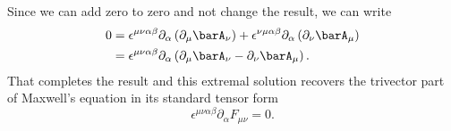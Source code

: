%
Since we can add zero to zero and not change the result, we can write
\begin{equation}\label{eqn:lagrangianFieldDensity:360}
\begin{aligned}
0
&=
  \epsilon^{\mu\nu\alpha\beta} \partial_{\alpha} \left(\partial_{\mu} \barA_{\nu} \right)
+ \epsilon^{\nu\mu\alpha\beta} \partial_{\alpha} \left(\partial_{\nu} \barA_{\mu} \right) \\
&= \epsilon^{\mu\nu\alpha\beta} \partial_{\alpha} \left(\partial_{\mu} \barA_{\nu} - \partial_{\nu} \barA_{\mu} \right) .
\end{aligned}
\end{equation}
%
That completes the result and this extremal solution recovers the trivector part of Maxwell's equation in its standard tensor form
%
\begin{equation}
\epsilon^{\mu\nu\alpha\beta} \partial_{\alpha} F_{\mu\nu} = 0.
\end{equation}
%
